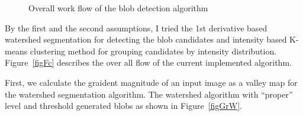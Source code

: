 \documentclass[10pt]{article}
\begin{document}
\begin{figure}[h!tb]
  \centering
  \caption{Overall work flow of the blob detection algorithm}
\end{figure}

By the first and the second assumptions, I tried the 1st derivative based watershed segmentation for detecting the blob candidates 
and intensity based K-means clustering method for grouping candidates by intensity distribution. Figure~\ref{figFc} describes the over all
flow of the current implemented algorithm.

First, we calculate the graident magnitude of an input image as a valley map for the watershed segmentation algorithm. 
The watershed algorithm with ``proper'' level and threshold generated blobs as shown in Figure~\ref{figGrW}. 
\end{document}

